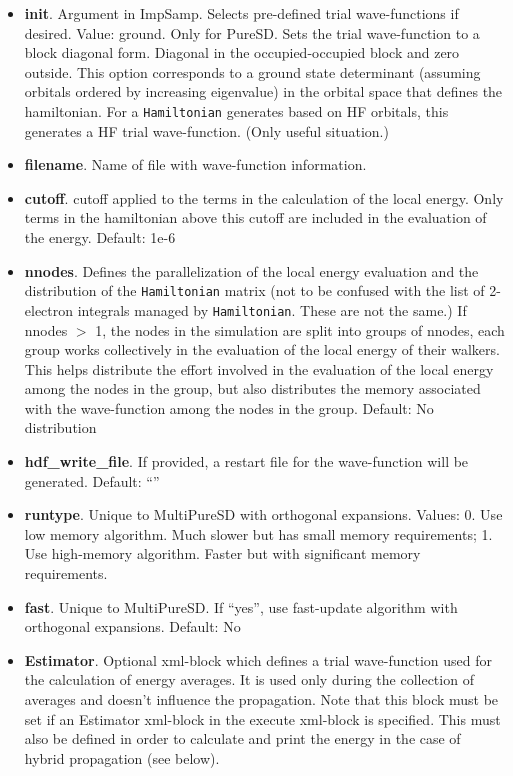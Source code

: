 \begin{itemize}
\item \textbf{init}. Argument in ImpSamp. Selects pre-defined trial wave-functions if desired. 
Value: ground. Only for PureSD. Sets the trial wave-function to a block diagonal form. Diagonal in the occupied-occupied block and zero outside. This option corresponds to a ground state determinant (assuming orbitals ordered by increasing eigenvalue) in the orbital space that defines the hamiltonian. For a \texttt{Hamiltonian} generates based on HF orbitals, this generates a HF trial wave-function. (Only useful situation.)
\item \textbf{filename}. Name of file with wave-function information.
\item \textbf{cutoff}. cutoff applied to the terms in the calculation of the local energy. Only terms in the hamiltonian above this cutoff are included in the evaluation of the energy.
      Default: 1e-6
\item \textbf{nnodes}. Defines the parallelization of the local energy evaluation and the distribution of the \texttt{Hamiltonian} matrix (not to be confused with the list of 2-electron integrals managed by \texttt{Hamiltonian}. These are not the same.) If nnodes $>$ 1, the nodes in the simulation are split into groups of nnodes, each group works collectively in the evaluation of the local energy of their walkers. This helps distribute the effort involved in the evaluation of the local energy among the nodes in the group, but also distributes the memory associated with the wave-function among the nodes in the group.
      Default: No distribution
\item \textbf{hdf\_write\_file}. If provided, a restart file for the wave-function will be generated.
      Default: ``''
\item \textbf{runtype}. Unique to MultiPureSD with orthogonal expansions.
      Values: 0.  Use low memory algorithm. Much slower but has small memory requirements;
      1. Use high-memory algorithm. Faster but with significant memory requirements.
\item \textbf{fast}. Unique to MultiPureSD. If ``yes'', use fast-update algorithm with orthogonal expansions.
      Default: No
\item \textbf{Estimator}. Optional xml-block which defines a trial wave-function used for the calculation of energy averages.  It is used only during the collection of averages and doesn't influence the propagation. Note that this block must be set if an Estimator xml-block in the execute xml-block is specified. This must also be defined in order to calculate and print the energy in the case of hybrid propagation (see below). \\
\end{itemize}

